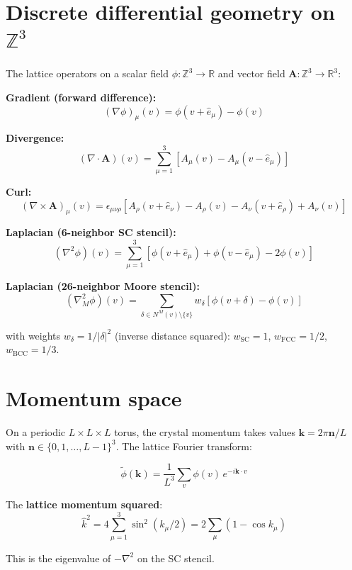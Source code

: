 \documentclass[
  11pt,
  letterpaper,
  twoside,
  openany]{book}
\makeatletter
\let\orig@section\section
\renewcommand{\section}{\needspace{8\baselineskip}\orig@section}
\makeatother
\begin{document}
\section{\texorpdfstring{Discrete differential geometry on
\(\mathbb{Z}^3\)}{Discrete differential geometry on \textbackslash mathbb\{Z\}\^{}3}}\label{discrete-differential-geometry-on-mathbbz3}

The lattice operators on a scalar field
\(\phi : \mathbb{Z}^3 \to \mathbb{R}\) and vector field
\(\mathbf{A} : \mathbb{Z}^3 \to \mathbb{R}^3\):

\textbf{Gradient (forward difference):} \[
(\nabla \phi)_\mu(v) = \phi(v + \hat{e}_\mu) - \phi(v)
\tag{P.1}
\]

\textbf{Divergence:} \[
(\nabla \cdot \mathbf{A})(v) = \sum_{\mu=1}^3 \left[ A_\mu(v) - A_\mu(v - \hat{e}_\mu) \right]
\tag{P.2}
\]

\textbf{Curl:} \[
(\nabla \times \mathbf{A})_\mu(v) = \epsilon_{\mu\nu\rho} \left[ A_\rho(v + \hat{e}_\nu) - A_\rho(v) - A_\nu(v + \hat{e}_\rho) + A_\nu(v) \right]
\tag{P.3}
\]

\textbf{Laplacian (6-neighbor SC stencil):} \[
(\nabla^2 \phi)(v) = \sum_{\mu=1}^3 \left[ \phi(v + \hat{e}_\mu) + \phi(v - \hat{e}_\mu) - 2\phi(v) \right]
\tag{P.4}
\]

\textbf{Laplacian (26-neighbor Moore stencil):} \[
(\nabla^2_M \phi)(v) = \sum_{\delta \in N^M(v) \setminus \{v\}} w_\delta \left[ \phi(v + \delta) - \phi(v) \right]
\tag{P.5}
\]

with weights \(w_\delta = 1/|\delta|^2\) (inverse distance squared):
\(w_{\text{SC}} = 1\), \(w_{\text{FCC}} = 1/2\),
\(w_{\text{BCC}} = 1/3\).

\section{Momentum space}\label{momentum-space}

On a periodic \(L \times L \times L\) torus, the crystal momentum takes
values \(\mathbf{k} = 2\pi \mathbf{n}/L\) with
\(\mathbf{n} \in \{0, 1, \ldots, L-1\}^3\). The lattice Fourier
transform:

\[
\tilde{\phi}(\mathbf{k}) = \frac{1}{L^3} \sum_{v} \phi(v) \, e^{-i\mathbf{k} \cdot v}
\tag{P.6}
\]

The \textbf{lattice momentum squared}: \[
\hat{k}^2 = 4 \sum_{\mu=1}^3 \sin^2(k_\mu/2) = 2\sum_\mu (1 - \cos k_\mu)
\tag{P.7}
\]

This is the eigenvalue of \(-\nabla^2\) on the SC stencil.
\end{document}
